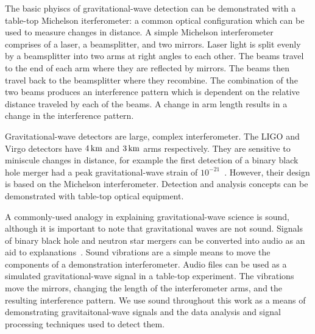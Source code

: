 \documentclass[paper-main.tex]{subfiles}
\begin{document}
The basic phyiscs of gravitational-wave detection can be demonstrated with a table-top Michelson iterferometer: a common optical configuration which can be used to measure changes in distance. 
A simple Michelson interferometer comprises of a laser, a beamsplitter, and two mirrors. 
Laser light is split evenly by a beamsplitter into two arms at right angles to each other. 
The beams travel to the end of each arm where they are reflected by mirrors. 
The beams then travel back to the beamsplitter where they recombine. 
The combination of the two beams produces an interference pattern which is dependent on the relative distance traveled by each of the beams. 
A change in arm length results in a change in the interference pattern. 



Gravitational-wave detectors are large, complex interferometer.
The LIGO and Virgo detectors have $4\,{\rm km}$ and $3\,{\rm km}$ arms respectively.
They are sensitive to miniscule changes in distance, for example the first detection of a binary black hole merger had a peak gravitational-wave strain of $10^{-21}$~\cite{GW150914}.
However, their design is based on the Michelson interferometer. 
Detection and analysis concepts can be demonstrated with table-top optical equipment. 
 



A commonly-used analogy in explaining gravitational-wave science is sound, although it is important to note that gravitational waves are not sound. 
Signals of binary black hole and neutron star mergers can be converted into audio as an aid to explanations~\cite{SoundsOfSpaceTime:online,BlackHoleHunter:online}. 
Sound vibrations are a simple means to move the components of a demonstration interferometer. 
Audio files can be used as a simulated gravitational-wave signal in a table-top experiment. 
The vibrations move the mirrors, changing the length of the interferometer arms, and the resulting interference pattern. 
We use sound throughout this work as a means of demonstrating gravitaitonal-wave signals and the data analysis and signal processing techniques used to detect them.
\end{document}
